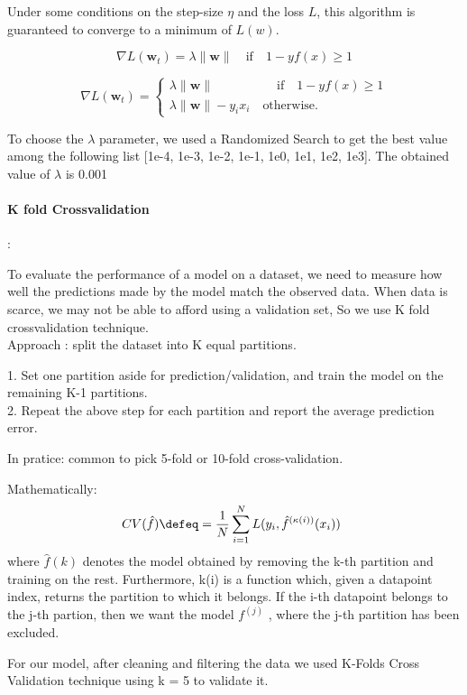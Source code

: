 \documentclass[11pt,french,english]{article}
\begin{document}
Under some conditions on the step-size $\eta$ and the loss $L$, this algorithm is guaranteed to converge to a minimum of $L(w)$.

$$\nabla L (\mathbf{w}_t)=\lambda \| \mathbf{w}\| \quad \text{if} \quad 1-yf(x)\geq 1$$
$$$$

$$\nabla L (\mathbf{w}_t)
=
\begin{cases}
\lambda \| \mathbf{w}\| \quad \quad \quad \quad\quad \text{if}\quad 1-yf(x) \geq 1 \\ \lambda \| \mathbf{w}\|-y_ix_i \quad\text{otherwise.}
\end{cases}
$$

To choose the $\lambda $ parameter, we used a Randomized Search to get the best value among the following list [1e-4, 1e-3, 1e-2, 1e-1, 1e0, 1e1, 1e2, 1e3]. The obtained value of $\lambda $ is 0.001

\paragraph{K fold Crossvalidation}: 

To evaluate the performance of a model on a dataset, we need to measure how well the predictions made by the model match the observed data. 
When data is scarce, we may not be able to afford using a validation set, So we use K fold crossvalidation technique.\\
Approach : split the dataset into K equal partitions.
\begin{itemize}
    1. Set one partition aside for prediction/validation, and train the model on the remaining K-1 partitions.\\
2. Repeat the above step for each partition and report the average prediction error.

\end{itemize}

In pratice: common to pick 5-fold or 10-fold cross-validation.

Mathematically: 
$$
        CV(\hat{f}) \defeq= \frac{1}{N} \sum_{i=1}^N L(y_i, \hat{f}^{(\kappa(i))}(x_i)) \enspace $$
where $\hat{f}(k)$ denotes the model obtained by removing the k-th partition and training on the
rest. Furthermore, k(i) is a function which, given a datapoint index, returns the partition to
which it belongs. If the i-th datapoint belongs to the j-th partion, then we want the model
$f^{(j)}$
, where the j-th partition has been excluded.


For our model, after cleaning and filtering the data we used K-Folds Cross Validation technique using k = 5 to validate it.
\end{document}
